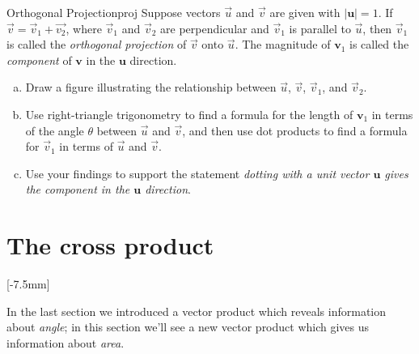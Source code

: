 \documentclass[prettycode,shellescape]{watsonbook}
\begin{document}
\begin{exercise}{Orthogonal Projection}{proj}
  Suppose vectors $\vec{u}$ and $\vec{v}$ are given with
  $|\mathbf{u}| = 1$. If $\vec{v} = \vec{v}_1 + \vec{v_2}$, where
  $\vec{v}_1$ and $\vec{v}_2$ are perpendicular and $\vec{v}_1$ is
  parallel to $\vec{u}$, then $\vec{v}_1$ is called the
  \textit{orthogonal projection} of $\vec{v}$ onto $\vec{u}$. The
  magnitude of $\mathbf{v}_1$ is called the \textit{component} of
  $\mathbf{v}$ in the $\mathbf{u}$ direction.

  \begin{enumerate}[(a)]
  \item Draw a figure illustrating the relationship between $\vec{u}$,
    $\vec{v}$, $\vec{v}_1$, and $\vec{v}_2$. 

  \item Use right-triangle trigonometry to find a formula for the
    length of $\mathbf{v}_1$ in terms of the angle $\theta$ between
    $\vec{u}$ and $\vec{v}$, and then use dot products to find a
    formula for $\vec{v}_1$ in terms of $\vec{u}$ and $\vec{v}$.

  \item Use your findings to support the statement \textit{dotting
      with a unit vector $\mathbf{u}$ gives the component in the
      $\mathbf{u}$ direction}. 
  \end{enumerate}
\end{exercise}

\section{The cross product} \label{sec:cross} 

[-7.5mm]

In the last section we introduced a vector product which reveals
information about \textit{angle}; in this section we'll see a new
vector product which gives us information about \textit{area}.
\end{document}

